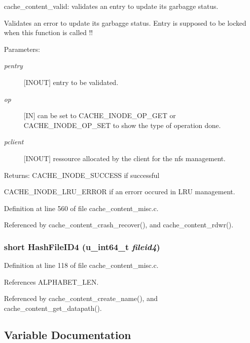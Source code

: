 cache\_\-content\_\-valid: validates an entry to update its garbagge status.

Validates an error to update its garbagge status. Entry is supposed to be locked when this function is called !!

\begin{Desc}
\item[Parameters:]
\begin{description}
\item[{\em pentry}][INOUT] entry to be validated. \item[{\em op}][IN] can be set to CACHE\_\-INODE\_\-OP\_\-GET or CACHE\_\-INODE\_\-OP\_\-SET to show the type of operation done. \item[{\em pclient}][INOUT] ressource allocated by the client for the nfs management.\end{description}
\end{Desc}
\begin{Desc}
\item[Returns:]CACHE\_\-INODE\_\-SUCCESS if successful \par
 

CACHE\_\-INODE\_\-LRU\_\-ERROR if an errorr occured in LRU management. \end{Desc}


Definition at line 560 of file cache\_\-content\_\-misc.c.

Referenced by cache\_\-content\_\-crash\_\-recover(), and cache\_\-content\_\-rdwr().
\subsubsection{\setlength{\rightskip}{0pt plus 5cm}short Hash\-File\-ID4 (u\_\-int64\_\-t {\em fileid4})}\label{cache__content__misc_8c_a3}




Definition at line 118 of file cache\_\-content\_\-misc.c.

References ALPHABET\_\-LEN.

Referenced by cache\_\-content\_\-create\_\-name(), and cache\_\-content\_\-get\_\-datapath().

\subsection{Variable Documentation}
